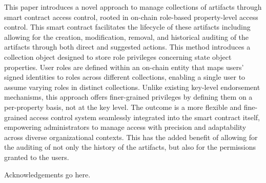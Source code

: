 \begin{abstractlong}
    This paper introduces a novel approach to manage  collections of artifacts through smart contract access control, rooted in on-chain role-based property-level access control. This smart contract facilitates the lifecycle of these artifacts including allowing for the creation,  modification, removal, and historical auditing  of the artifacts through both direct and suggested  actions. This method introduces a collection object designed to store role privileges concerning state object properties. User roles are defined within an on-chain entity that maps users' signed identities to roles across different collections, enabling a single user to assume varying roles in distinct collections. Unlike existing key-level endorsement mechanisms, this approach offers finer-grained privileges by defining them on a per-property basis, not at the key level. The outcome is a more flexible and fine-grained access control system seamlessly integrated into the smart contract itself, empowering administrators to manage access with precision and adaptability across diverse organizational contexts.  This has the added benefit of allowing for the auditing of not only the history of the artifacts, but also for the permissions granted to the users.
\end{abstractlong}

\begin{acknowledgementslong}
    Acknowledgements go here.
\end{acknowledgementslong}
